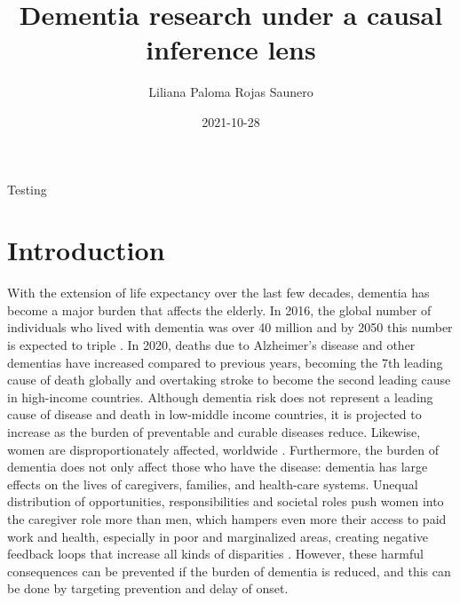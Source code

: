 \documentclass[
]{book}
\title{Dementia research under a causal inference lens}
\author{Liliana Paloma Rojas Saunero}
\date{2021-10-28}
\begin{document}
\maketitle

{
\setcounter{tocdepth}{1}
\tableofcontents
}
Testing

\hypertarget{intro}{%
\chapter{Introduction}\label{intro}}

With the extension of life expectancy over the last few decades, dementia has become a major burden that affects the elderly. In 2016, the global number of individuals who lived with dementia was over 40 million \autocite{gbd2016} and by 2050 this number is expected to triple \autocite{worldreport2018}. In 2020, deaths due to Alzheimer's disease and other dementias have increased compared to previous years, becoming the 7th leading cause of death globally and overtaking stroke to become the second leading cause in high-income countries. Although dementia risk does not represent a leading cause of disease and death in low-middle income countries, it is projected to increase as the burden of preventable and curable diseases reduce\autocite{who2020}. Likewise, women are disproportionately affected, worldwide \autocite{women2015}. Furthermore, the burden of dementia does not only affect those who have the disease: dementia has large effects on the lives of caregivers, families, and health-care systems. Unequal distribution of opportunities, responsibilities and societal roles push women into the caregiver role more than men, which hampers even more their access to paid work and health, especially in poor and marginalized areas, creating negative feedback loops that increase all kinds of disparities \autocite{swinkels2019,brodaty2009,etters2008}. However, these harmful consequences can be prevented if the burden of dementia is reduced, and this can be done by targeting prevention and delay of onset\autocite{carrillo2013}.
\end{document}
